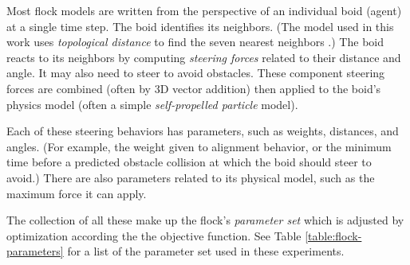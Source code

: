 \documentclass[letterpaper]{article}
\begin{document}
Most flock models are written from the perspective of an individual boid (agent) at a single time step. The boid identifies its neighbors. (The model used in this work uses \textit{topological distance} to find the seven nearest neighbors \citep{cavagna_seventh_2008}.) The boid reacts to its neighbors by computing \textit{steering forces} related to their distance and angle. It may also need to steer to avoid obstacles. These component steering forces are combined (often by 3D vector addition) then applied to the boid's physics model (often a simple \textit{self-propelled particle} model).

Each of these steering behaviors has parameters, such as weights, distances, and angles. (For example, the weight given to alignment behavior, or the minimum time before a predicted obstacle collision at which the boid should steer to avoid.) There are also parameters related to its physical model, such as the maximum force it can apply.

The collection of all these make up the flock's \textit{parameter set} which is adjusted by optimization according the the objective function. See Table \ref{table:flock-parameters} for a list of the parameter set used in these experiments.

\end{document}
